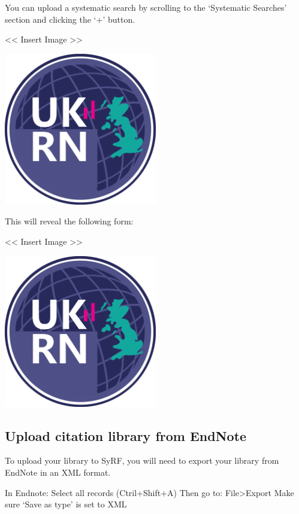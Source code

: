 \documentclass[]{book}
\begin{document}
You can upload a systematic search by scrolling to the `Systematic
Searches' section and clicking the `+' button.

\textless{}\textless{} Insert Image \textgreater{}\textgreater{}

\includegraphics[width=0.50000\textwidth,height=0.50000\textwidth]{figs/evidence-triangle.png}

This will reveal the following form:

\textless{}\textless{} Insert Image \textgreater{}\textgreater{}

\includegraphics[width=0.50000\textwidth,height=0.50000\textwidth]{figs/evidence-triangle.png}

\subsection{Upload citation library from
EndNote}\label{upload-citation-library-from-endnote}

To upload your library to SyRF, you will need to export your library
from EndNote in an XML format.

In Endnote: Select all records (Ctril+Shift+A) Then go to:
File\textgreater{}Export Make sure `Save as type' is set to XML
\end{document}
